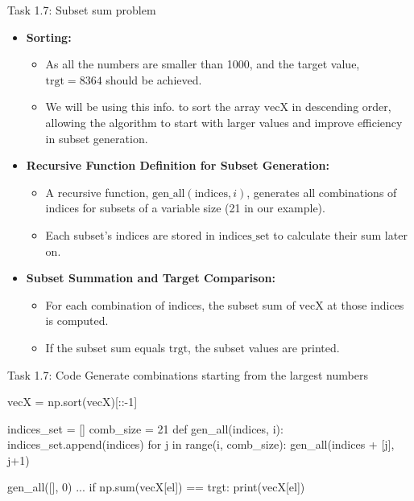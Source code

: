 \documentclass[aspectratio=169]{beamer}
\begin{document}
\begin{frame}{Task 1.7: Subset sum problem}

    \begin{itemize}
        \item \textbf{Sorting:}
        \begin{itemize}
            \item As all the numbers are smaller than 1000, and the target value, \( \text{trgt} = 8364 \) should be achieved.
            \item We will be using this info. to sort the array \( \text{vecX} \) in descending order, allowing the algorithm to start with larger values and improve efficiency in subset generation.
        \end{itemize}

        \item \textbf{Recursive Function Definition for Subset Generation:}
        \begin{itemize}
            \item A recursive function, \( \text{gen\_all}(\text{indices}, i) \), generates all combinations of indices for subsets of a variable size (21 in our example).
            \item Each subset's indices are stored in \( \text{indices\_set} \) to calculate their sum later on.
        \end{itemize}

        \item \textbf{Subset Summation and Target Comparison:}
        \begin{itemize}
            \item For each combination of indices, the subset sum of \( \text{vecX} \) at those indices is computed.
            \item If the subset sum equals \( \text{trgt} \), the subset values are printed.
        \end{itemize}
    \end{itemize}

\end{frame}

\begin{frame}[fragile]{Task 1.7: Code}
    Generate combinations starting from the largest numbers
    \begin{mylisting}
    vecX = np.sort(vecX)[::-1]

    indices_set = []
    comb_size = 21
    def gen_all(indices, i):
      indices_set.append(indices)
      for j in range(i, comb_size):
        gen_all(indices + [j], j+1)

    gen_all([], 0)
    ...
    if np.sum(vecX[el]) == trgt:
        print(vecX[el])
    \end{mylisting}

\end{frame}
\end{document}
